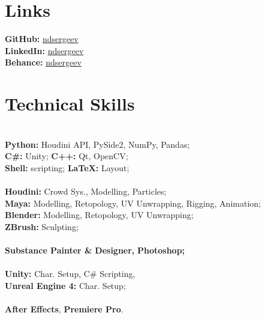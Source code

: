 \documentclass[]{cv-class}
\begin{document}
\begin{minipage}[t]{0.3\textwidth}
\section{Links}
\textcolor{subsec_col}{\textbf{GitHub:}} \href{https://github.com/ndsergeev}{ndsergeev} \\
\textcolor{subsec_col}{\textbf{LinkedIn:}} \href{https://www.linkedin.com/in/ndsergeev/}{ndsergeev} \\
\textcolor{subsec_col}{\textbf{Behance:}} \href{https://www.behance.net/ndsergeev}{ndsergeev}

\smallSeparator{0.4pt}
\section{Technical Skills}
{} \\
\textbf{Python:} Houdini API, PySide2, NumPy, Pandas; \\
\textbf{C\#:} Unity; \textbf{C++:} Qt, OpenCV; \\
\textbf{Shell:} scripting; \textbf{\LaTeX:} Layout; \\

{} \\
\textbf{Houdini:} Crowd Sys., Modelling, Particles; \\
\textbf{Maya:} Modelling, Retopology, UV Unwrapping, Rigging, Animation; \\
\textbf{Blender:} Modelling, Retopology, UV Unwrapping; \\
\textbf{ZBrush:} Sculpting; \\

{} \\
\textbf{Substance Painter \&}
\textbf{Designer,}
\textbf{Photoshop;} \\

{} \\
\textbf{Unity:} Char. Setup, C\# Scripting,\\
\textbf{Unreal Engine 4:} Char. Setup; \\

{} \\
\textbf{After Effects},
\textbf{Premiere Pro}.

\smallSeparator{0.4pt}

\end{minipage}
\end{document}
